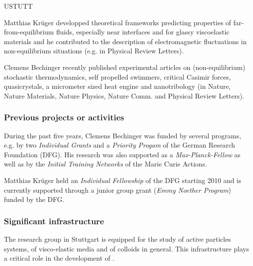 \begin{sitedescription}{USTUTT}
\begin{compactenum}
\item Matthias Krüger developped theoretical frameworks predicting properties of
far-from-equilibrium fluids, especially near interfaces and for glassy viscoelastic
materials and he contributed to the description of electromagnetic fluctuations in
non-equilibrium situations (e.g. in Physical Review Letters).
\item Clemens Bechinger recently published experimental articles on (non-equilibrium)
stochastic thermodynamics, self propelled swimmers, critical Casimir forces, quasicrystals,
a micrometer sized heat engine and nanotribology (in Nature, Nature Materials, Nature
Physics, Nature Comm. and Physical Review Letters).
\end{compactenum}

\subsubsection*{Previous projects or activities}

\begin{compactenum}
\item During the past five years, Clemens Bechinger was funded by several programs, e.g. by
two {\it Individual Grants} and a {\it Priority Progam} of the German Research Foundation
(DFG). His research was also supported as a {\it Max-Planck-Fellow} as well as by the {\it
  Initial Training Networks} of the Marie Curie Actions.
\item Matthias Krüger held an {\it Individual Fellowship} of the DFG starting 2010 and is
currently supported through a junior group grant ({\it Emmy Noether Program}) funded by the
DFG.
\end{compactenum}

\subsubsection*{Significant infrastructure}
The research group in Stuttgart is equipped for the study of active particles systems, of
visco-elastic media and of colloids in general.
%
This infrastructure plays a critical role in the development of \TheProject.

\end{sitedescription}
